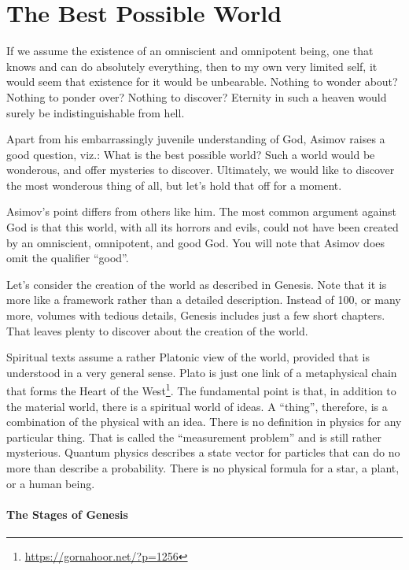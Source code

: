 \section{The Best Possible World}

\begin{quotex}
If we assume the existence of an omniscient and omnipotent being, one that knows and can do absolutely everything, then to my own very limited self, it would seem that existence for it would be unbearable. Nothing to wonder about? Nothing to ponder over? Nothing to discover? Eternity in such a heaven would surely be indistinguishable from hell.
\end{quotex}


Apart from his embarrassingly juvenile understanding of God, Asimov raises a good question, viz.: What is the best possible world? Such a world would be wonderous, and offer mysteries to discover. Ultimately, we would like to discover the most wonderous thing of all, but let's hold that off for a moment.

Asimov's point differs from others like him. The most common argument against God is that this world, with all its horrors and evils, could not have been created by an omniscient, omnipotent, and good God. You will note that Asimov does omit the qualifier ``good''.

Let's consider the creation of the world as described in Genesis. Note that it is more like a framework rather than a detailed description. Instead of 100, or many more, volumes with tedious details, Genesis includes just a few short chapters. That leaves plenty to discover about the creation of the world.

Spiritual texts assume a rather Platonic view of the world, provided that is understood in a very general sense. Plato is just one link of a metaphysical chain that forms the Heart of the West\footnote{\url{https://gornahoor.net/?p=1256}}. The fundamental point is that, in addition to the material world, there is a spiritual world of ideas. A ``thing'', therefore, is a combination of the physical with an idea. There is no definition in physics for any particular thing. That is called the ``measurement problem'' and is still rather mysterious. Quantum physics describes a state vector for particles that can do no more than describe a probability. There is no physical formula for a star, a plant, or a human being.

\paragraph{The Stages of Genesis}


